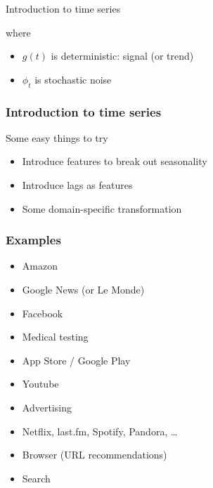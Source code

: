 \begin{frame}{Introduction to time series}
{    where
    \begin{itemize}
    \item[] $g(t)$ is deterministic: signal (or trend)
    \item[] $\phi_t$ is stochastic noise
    \end{itemize}
  }
\end{frame}

\begin{frame}
  \frametitle{Introduction to time series}

  Some easy things to try
  
  \begin{itemize}
  \item Introduce features to break out seasonality
  \item Introduce lags as features
  \item Some domain-specific transformation
  \end{itemize}
\end{frame}

\begin{frame}
\end{frame}






\begin{frame}
  \frametitle{Examples}
  \begin{itemize}
  \item Amazon
  \item Google News (or Le Monde)
  \item Facebook
  \item Medical testing
  \item App Store / Google Play
  \item Youtube
  \item Advertising
  \item Netflix, last.fm, Spotify, Pandora, \dots
  \item Browser (URL recommendations)
  \item Search
  \end{itemize}
\end{frame}

